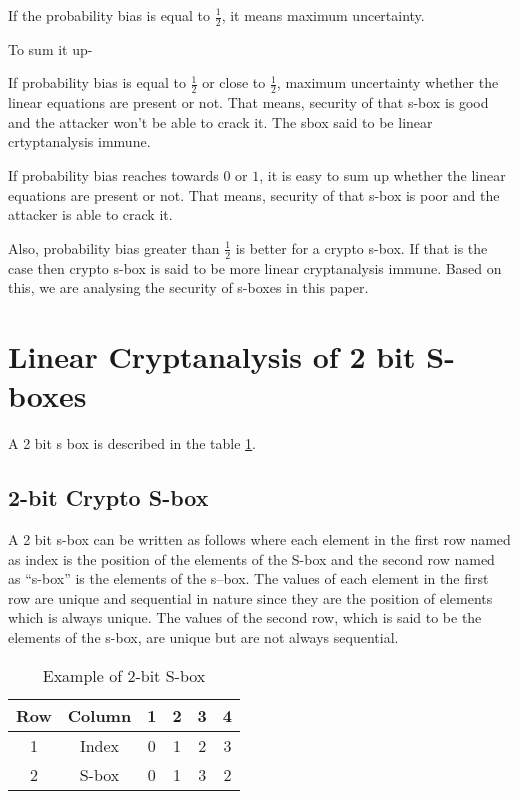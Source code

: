 \documentclass[12pt]{article}
\begin{document}
If the probability bias is equal to $ \frac{1}{2} $, it means maximum uncertainty.  

To sum it up- 

If probability bias is equal to $ \frac{1}{2} $ or close to $ \frac{1}{2} $, maximum uncertainty whether the linear equations are present or not. That means, security of that s-box is good and the attacker won’t be able to crack it. The sbox said to be linear crtyptanalysis immune. 

If probability bias reaches towards $ 0 $ or $ 1 $, it is easy to sum up whether the linear equations are present or not. That means, security of that s-box is poor and the attacker is able to crack it.  

Also, probability bias greater than $ \frac{1}{2} $ is better for a crypto s-box. If that is the case then crypto s-box is said to be more linear cryptanalysis immune.
Based on this, we are analysing the security of s-boxes in this paper. 
\section{Linear Cryptanalysis of 2 bit S-boxes}
A 2 bit s box is described in the table \ref{table:1}.
\subsection{2-bit Crypto S-box}
A 2 bit s-box can be written as follows where each element in the first row named as index is the position of the elements of the S-box and the second row named as “s-box” is the elements of the s–box. The values of each element in the first row are unique and sequential in nature since they are the position of elements which is always unique. The values of the second row, which is said to be the elements of the s-box, are unique but are not always sequential.  
\begin{table}[H]
    \centering
    \begin{tabular}{|c|c|c|c|c|c|}
        \hline
        Row & Column & 1 & 2 & 3 & 4 \\
        \hline
        1 & Index & 0 & 1 & 2 & 3 \\
        \hline
        2 & S-box & 0 & 1 & 3 & 2 \\
        \hline
    \end{tabular}
    \caption{Example of 2-bit S-box}
    \label{table:1}
\end{table}
\end{document}
